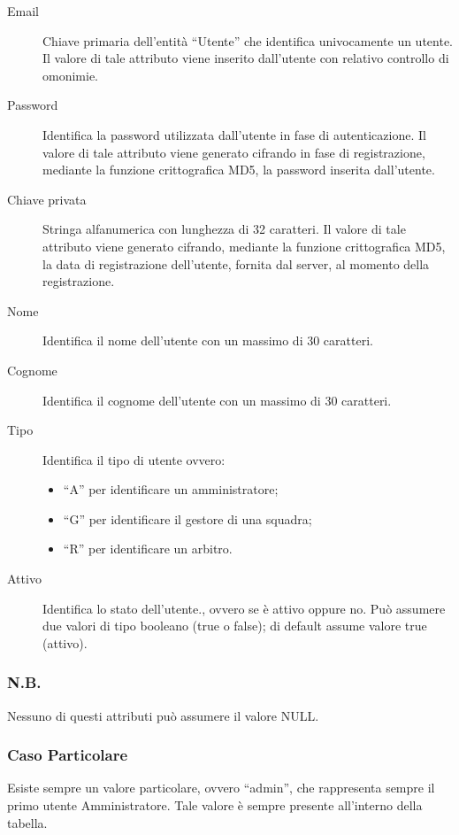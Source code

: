 		\begin{description}
			
			\item[Email]
			Chiave primaria dell'entità ``Utente'' che identifica univocamente un utente. Il valore di tale attributo viene inserito dall'utente con relativo controllo di omonimie.
			
			\item[Password]
			Identifica la password utilizzata dall'utente in fase di autenticazione. Il valore di tale attributo viene generato cifrando in fase di registrazione, mediante la funzione crittografica MD5, la password inserita dall'utente.
			
			\item[Chiave privata]
			Stringa alfanumerica con lunghezza di 32 caratteri. Il valore di tale attributo viene generato cifrando, mediante la funzione crittografica MD5, la data di registrazione dell'utente, fornita dal server, al momento della registrazione.
			
			\item[Nome]
			Identifica il nome dell'utente con un massimo di 30 caratteri.
			
			\item[Cognome]
			Identifica il cognome dell'utente con un massimo di 30 caratteri.
			
			\item[Tipo]
			Identifica il tipo di utente ovvero:
			\begin{itemize}
				\item
				``A'' per identificare un amministratore;
				\item
				``G'' per identificare il gestore di una squadra;
				\item
				``R'' per identificare un arbitro.
			\end{itemize}
			
			\item[Attivo]
			Identifica lo stato dell'utente., ovvero se è attivo oppure no. Può assumere due valori di tipo booleano (true o false); di default assume valore true (attivo).
			
		\end{description}
		
		\subsubsection*{N.B.}
		Nessuno di questi attributi può assumere il valore NULL.
		
		\subsubsection*{Caso Particolare}
		Esiste sempre un valore particolare, ovvero ``admin'', che rappresenta sempre il primo utente Amministratore. Tale valore è sempre presente all'interno della tabella.
	
